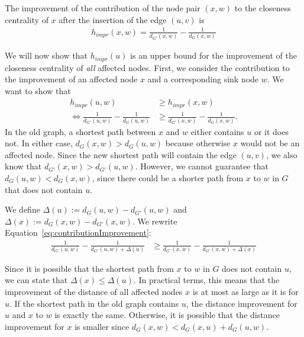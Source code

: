 \begin{definition}
The improvement of the contribution of the node pair $(x, w)$ to the closeness centrality of $x$ after the insertion of the edge $(u, v)$ is 
\begin{align}
	h_{impr}(x, w) = \frac{1}{d_{G'}(x, w)} - \frac{1}{d_{G}(x, w)}
\end{align}
\end{definition}

We will now show that $h_{impr}(u)$ is an upper bound for the improvement of the closeness centrality of \emph{all} affected nodes. First, we consider the contribution to the improvement of an affected node $x$ and a corresponding sink node $w$. We want to show that 
\begin{align}
	h_{impr}(u, w) &\geq h_{impr}(x, w) \nonumber \\
	\iff \frac{1}{d_{G'}(u, w)} - \frac{1}{d_{G}(u, w)} &\geq \frac{1}{d_{G'}(x, w)} - \frac{1}{d_{G}(x, w)} \label{eq:contributionImprovement}.
\end{align}
In the old graph, a shortest path between $x$ and $w$ either contains $u$ or it does not. In either case, $d_G(x, w) > d_G(u, w)$ because otherwise $x$ would not be an affected node. Since the new shortest path will contain the edge $(u, v)$, we also know that $d_{G'}(x, w) > d_{G'}(u, w)$. However, we cannot guarantee that $d_G(u, w) < d_G(x, w)$, since there could be a shorter path from $x$ to $w$ in $G$ that does not contain $u$.

We define $\Delta(u) := d_G(u, w) - d_{G'}(u, w)$ and $\Delta(x) := d_G(x, w) - d_{G'}(x, w)$. We rewrite Equation~\ref{eq:contributionImprovement}:
\begin{align}
	\frac{1}{d_{G'}(u, w)} - \frac{1}{d_{G'}(u, w) + \Delta(u)} &\geq \frac{1}{d_{G'}(x, w)} - \frac{1}{d_{G'}(x, w) + \Delta(x)}
\end{align}

Since it is possible that the shortest path from $x$ to $w$ in $G$ does not contain $u$, we can state that $\Delta(x) \leq \Delta(u)$. In practical terms, this means that the improvement of the distance of all affected nodes $x$ is at most as large as it is for $u$. If the shortest path in the old graph contains $u$, the distance improvement for $u$ and $x$ to $w$ is exactly the same. Otherwise, it is possible that the distance improvement for $x$ is smaller since $d_G(x, w) < d_G(x, u) + d_G(u, w)$.

